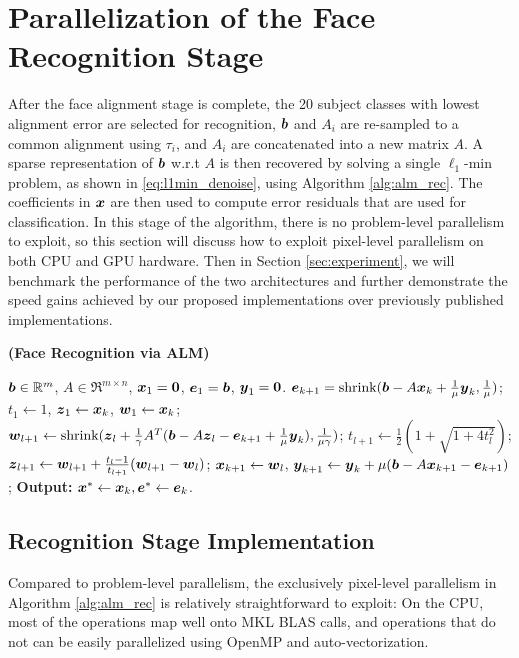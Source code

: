 \documentclass[preprint]{sigplanconf}
\begin{document}
\section{Parallelization of the Face Recognition Stage} 
\label{sec:recognition}
After the face alignment stage is complete, the 20 subject classes with lowest
alignment error are selected for recognition, ${\boldsymbol{b}}$ and $A_i$ are re-sampled to a common alignment
using $\tau_i$, and $A_i$ are concatenated into a new matrix $A$.
A sparse representation of ${\boldsymbol{b}}$ w.r.t $A$ is then recovered
by solving a single $\ell_1$-min problem, as shown
in \eqref{eq:l1min_denoise}, using Algorithm \ref{alg:alm_rec}.  The
coefficients in ${\boldsymbol{x}}$ are then used to compute error residuals that are used for
classification.  
In this stage of the algorithm, there is no problem-level
parallelism to exploit, so this section will discuss how to exploit pixel-level parallelism
on both CPU and GPU hardware.
Then in Section \ref{sec:experiment}, we will benchmark the
performance of the two architectures and further demonstrate the speed
gains achieved by our proposed implementations over previously published implementations.

\begin{algorithm}[t]
\caption{\bf (Face Recognition via ALM)} \label{alg:alm_rec} 
\begin{algorithmic}[1]
\begin{small}
 ${\boldsymbol{b}} \in {\mathbb{R}}^m$, $A \in \Re^{m \times n}$,
${\boldsymbol{x}}_1 = \boldsymbol{0}$, $\boldsymbol{e}_1 = {\boldsymbol{b}}$, $\boldsymbol{y}_1 =
\boldsymbol{0}$.
\STATE $\boldsymbol{e}_{k+1} = {\text{shrink}}({\boldsymbol{b}} - A{\boldsymbol{x}}_k +
\frac{1}{\mu}\boldsymbol{y}_k, \frac{1}{\mu})$;
\STATE $t_1\leftarrow 1$, $\boldsymbol{z}_1 \leftarrow {\boldsymbol{x}}_k$, $\boldsymbol{w}_1 \leftarrow {\boldsymbol{x}}_k$;
\STATE $\boldsymbol{w}_{l+1} \leftarrow {\text{shrink}}(\boldsymbol{z}_l +
\frac{1}{\gamma}A^T({\boldsymbol{b}} - A\boldsymbol{z}_l - \boldsymbol{e}_{k+1} +
\frac{1}{\mu}\boldsymbol{y}_k), \frac{1}{\mu\gamma})$;
\STATE $t_{l+1} \leftarrow \frac{1}{2}( 1 +
\sqrt{1+4t_l^2})$;
\STATE $\boldsymbol{z}_{l+1} \leftarrow \boldsymbol{w}_{l+1} + \frac{t_l - 1}{t_{l+1}}(\boldsymbol{w}_{l+1} - \boldsymbol{w}_l)$;
\ENDWHILE
\STATE ${\boldsymbol{x}}_{k+1} \leftarrow \boldsymbol{w}_{l}$,  \; $\boldsymbol{y}_{k+1} \leftarrow \boldsymbol{y}_k + \mu ({\boldsymbol{b}} - A{\boldsymbol{x}}_{k+1} - \boldsymbol{e}_{k+1})$;
\ENDWHILE \STATE
{\bf Output:} ${\boldsymbol{x}}^* \leftarrow {\boldsymbol{x}}_k, \boldsymbol{e}^* \leftarrow \boldsymbol{e}_k$.
\end{small}
\end{algorithmic}
\end{algorithm}

\subsection{Recognition Stage Implementation} 
Compared to problem-level
parallelism, the exclusively pixel-level parallelism in Algorithm \ref{alg:alm_rec} is
relatively straightforward to exploit:  
On the CPU, most of the operations map
well onto MKL BLAS calls, and operations that do not can be easily
parallelized using OpenMP and auto-vectorization.
\end{document}
